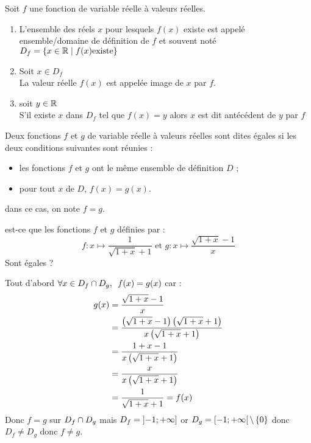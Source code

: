 \begin{defi}
	Soit \(f\) une fonction de variable réelle à valeurs réelles.
	\begin{enumerate}
		\item L’ensemble des réels \(x\) pour lesquels \(f(x)\) existe est appelé ensemble/domaine de définition de \(f\) et souvent noté \(D_f = \left\lbrace x \in \mathbb{R} \;\middle|\; f(x) \text{existe}\right\rbrace\)
		\item Soit \(x \in D_f\)\\
		      La valeur réelle \(f(x)\) est appelée image de \(x\) par \(f\). \\
		\item soit \( y \in \mathbb{R}\) \\
		      S'il existe \(x\) dans \(D_f\) tel que \(f(x) = y\) alors \(x\) est dit antécédent de \(y\) par \(f\)
	\end{enumerate}
\end{defi}

\begin{defprop}
	Deux fonctions \(f\) et \(g\) de variable réelle à valeurs réelles sont dites égales si les deux conditions suivantes sont réunies :
	\begin{itemize}
		\item les fonctions \(f\) et \(g\) ont le même ensemble de définition \(D\) ;
		\item pour tout \(x\) de \(D\), \(f(x) = g(x)\).
	\end{itemize}
	dans ce cas, on note \(f = g\).
\end{defprop}

\begin{exoex}
	est-ce que les fonctions \(f\) et \(g\) définies par :
	\[f: x\mapsto\frac{1}{\sqrt{1+x}+1} \text{ et } g:  x\mapsto\frac{\sqrt{1+x}-1}{x}\]
	Sont égales ?
\end{exoex}
\begin{corr}
	Tout d'abord \(\quantifs{\forall x \in D_f\inter D_g} f(x) = g(x)\) car :
	\begin{align*} g(x) & = \frac{\sqrt{1+x}-1}{x}                                                 \\
                    & = \frac{\left(\sqrt{1+x}-1\right)\left(\sqrt{1+x}+1\right)}{x\left(\sqrt{1+x}+1\right)} \\
                    & = \frac{1+x-1}{x\left(\sqrt{1+x}+1\right)}                                    \\
                    & = \frac{x}{x\left(\sqrt{1+x}+1\right)}                                        \\
                    & = \frac{1}{\sqrt{1+x}+1} = f(x)
	\end{align*}
	Donc \(f = g\) sur \(D_f\cap D_g\) mais
	\(D_f = \left]-1;+\infty\right]\) or \(D_g = \left[-1;+\infty\right[\backslash\left\lbrace0\right\rbrace\) donc \(D_f \neq D_g\) donc \(f \neq g\).
\end{corr}

